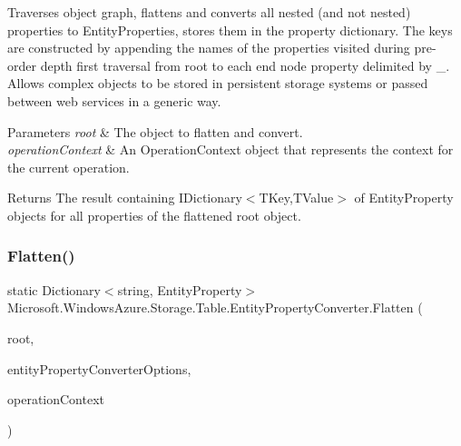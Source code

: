Traverses object graph, flattens and converts all nested (and not nested) properties to Entity\+Properties, stores them in the property dictionary. The keys are constructed by appending the names of the properties visited during pre-\/order depth first traversal from root to each end node property delimited by \textquotesingle{}\+\_\+\textquotesingle{}. Allows complex objects to be stored in persistent storage systems or passed between web services in a generic way. 


\begin{DoxyParams}{Parameters}
{\em root} & The object to flatten and convert.\\
\hline
{\em operation\+Context} & An Operation\+Context object that represents the context for the current operation.\\
\hline
\end{DoxyParams}
\begin{DoxyReturn}{Returns}
The result containing I\+Dictionary$<$\+T\+Key,\+T\+Value$>$ of Entity\+Property objects for all properties of the flattened root object.
\end{DoxyReturn}
\mbox{\label{classMicrosoft_1_1WindowsAzure_1_1Storage_1_1Table_1_1EntityPropertyConverter_a45373e2614d05c18ecb74bdcafc572b6_a45373e2614d05c18ecb74bdcafc572b6}} 
\subsubsection{\texorpdfstring{Flatten()}{Flatten()}\hspace{0.1cm}{\footnotesize\ttfamily [2/2]}}
{\footnotesize\ttfamily static Dictionary$<$string, Entity\+Property$>$ Microsoft.\+Windows\+Azure.\+Storage.\+Table.\+Entity\+Property\+Converter.\+Flatten (\begin{DoxyParamCaption}\item[{object}]{root,  }\item[{Entity\+Property\+Converter\+Options}]{entity\+Property\+Converter\+Options,  }\item[{Operation\+Context}]{operation\+Context }\end{DoxyParamCaption})\hspace{0.3cm}{\ttfamily [static]}}



